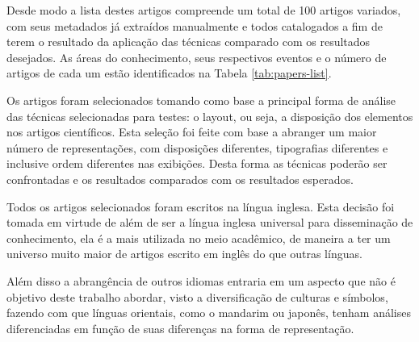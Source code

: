\documentclass[
	12pt,               %
	openright,          %
	twoside,            %
	a4paper,            %
	english,            %
	brazil              %
	]{abntex2}
\begin{document}

Desde modo a lista destes artigos compreende um total de 100 artigos variados, com seus metadados já extraídos manualmente e todos catalogados a fim de terem o resultado da aplicação das técnicas comparado com os resultados desejados. As áreas do conhecimento, seus respectivos eventos e o número de artigos de cada um estão identificados na Tabela \ref{tab:papers-list}.

Os artigos foram selecionados tomando como base a principal forma de análise das técnicas selecionadas para testes: o layout, ou seja, a disposição dos elementos nos artigos científicos. Esta seleção foi feite com base a abranger um maior número de representações, com disposições diferentes, tipografias diferentes e inclusive ordem diferentes nas exibições. Desta forma as técnicas poderão ser confrontadas e os resultados comparados com os resultados esperados.


Todos os artigos selecionados foram escritos na língua inglesa. Esta decisão foi tomada em virtude de além de ser a língua inglesa universal para disseminação de conhecimento, ela é a mais utilizada no meio acadêmico, de maneira a ter um universo muito maior de artigos escrito em inglês do que outras línguas.

Além disso a abrangência de outros idiomas entraria em um aspecto que não é objetivo deste trabalho abordar, visto a diversificação de culturas e símbolos, fazendo com que línguas orientais, como o mandarim ou japonês, tenham análises diferenciadas em função de suas diferenças na forma de representação.
\end{document}

